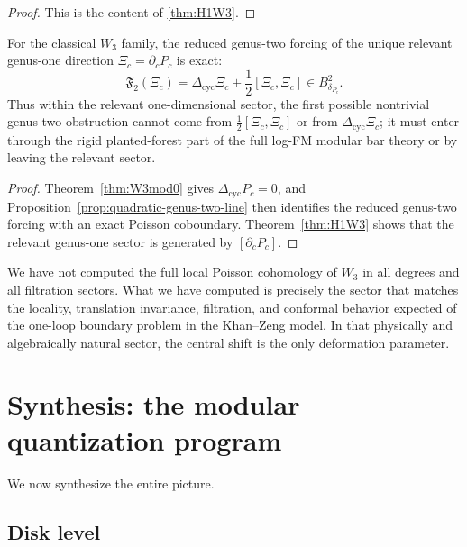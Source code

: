 \begin{proof}
This is the content of \cref{thm:H1W3}.
\end{proof}


\begin{corollary}
\label{cor:w3-no-quadratic-self-obstruction}
For the classical $W_3$ family, the reduced genus-two forcing of the unique
relevant genus-one direction $\Xi_c=\partial_cP_c$ is exact:
\[
\mathfrak F_2(\Xi_c)
=
\Delta_{\mathrm{cyc}}\Xi_c+\frac12[\Xi_c,\Xi_c]
\in B^2_{\delta_{P_c}}.
\]
Thus within the relevant one-dimensional sector, the first possible
nontrivial genus-two obstruction cannot come from $\frac12[\Xi_c,\Xi_c]$
or from $\Delta_{\mathrm{cyc}}\Xi_c$; it must enter through the rigid
planted-forest part of the full log-FM modular bar theory or by leaving the
relevant sector.
\end{corollary}

\begin{proof}
Theorem~\ref{thm:W3mod0} gives $\Delta_{\mathrm{cyc}}P_c=0$, and
Proposition~\ref{prop:quadratic-genus-two-line} then identifies the reduced
genus-two forcing with an exact Poisson coboundary.  Theorem~\ref{thm:H1W3}
shows that the relevant genus-one sector is generated by $[\partial_cP_c]$.
\end{proof}

\begin{remark}
We have not computed the full local Poisson cohomology of $W_3$ in all degrees and all
filtration sectors. What we have computed is precisely the sector that matches the locality,
translation invariance, filtration, and conformal behavior expected of the one-loop boundary
problem in the Khan--Zeng model. In that physically and algebraically natural sector, the
central shift is the only deformation parameter.
\end{remark}

\section{Synthesis: the modular quantization program}

We now synthesize the entire picture.

\subsection{Disk level}

